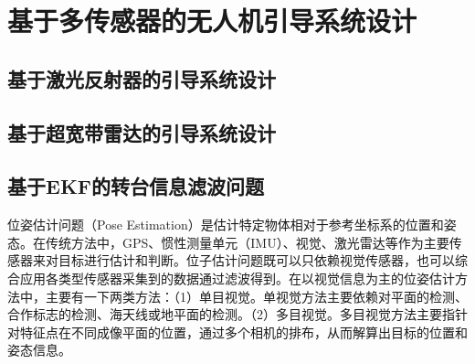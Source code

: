 \chapter{基于多传感器的无人机引导系统设计}

\section{基于激光反射器的引导系统设计}

\section{基于超宽带雷达的引导系统设计}

\section{基于EKF的转台信息滤波问题}
位姿估计问题（Pose Estimation）是估计特定物体相对于参考坐标系的位置和姿态。在传统方法中，GPS、惯性测量单元（IMU）、视觉、激光雷达等作为主要传感器来对目标进行估计和判断。位子估计问题既可以只依赖视觉传感器，也可以综合应用各类型传感器采集到的数据通过滤波得到。在以视觉信息为主的位姿估计方法中，主要有一下两类方法：（1）单目视觉。单视觉方法主要依赖对平面的检测、合作标志的检测、海天线或地平面的检测。（2）多目视觉。多目视觉方法主要指针对特征点在不同成像平面的位置，通过多个相机的排布，从而解算出目标的位置和姿态信息。

